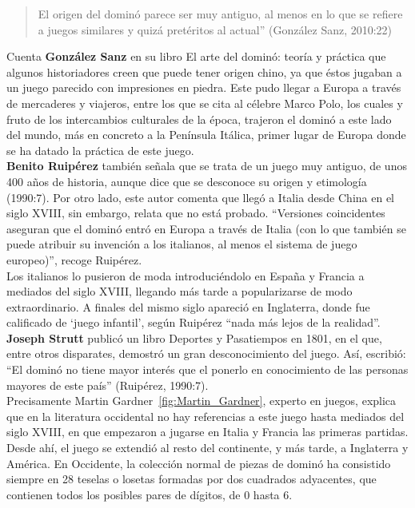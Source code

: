 \begin{quote}
El origen del dominó parece ser muy antiguo, al menos en lo que se refiere a juegos similares y quizá
pretéritos al actual” (González Sanz, 2010:22)
\end{quote}

Cuenta \textbf{González Sanz} en su libro El arte del dominó: teoría y práctica \cite{sanz00} que algunos historiadores
creen que puede tener origen chino, ya que éstos jugaban a un juego parecido con impresiones en piedra. Este pudo llegar a Europa a través de mercaderes y viajeros, entre los que se cita al célebre
Marco Polo, los cuales y fruto de los intercambios culturales de la época, trajeron el dominó a este
lado del mundo, más en concreto a la Península Itálica, primer lugar de Europa donde se ha datado la
práctica de este juego. \\

\textbf{Benito Ruipérez} \cite{mora90} también señala que se trata de un juego muy antiguo, de unos 400 años de historia,
aunque dice que se desconoce su origen y etimología (1990:7). Por otro lado, este autor comenta que
llegó a Italia desde China en el siglo XVIII, sin embargo, relata que no está probado. “Versiones
coincidentes aseguran que el dominó entró en Europa a través de Italia (con lo que también se puede
atribuir su invención a los italianos, al menos el sistema de juego europeo)”, recoge Ruipérez. \\

Los italianos lo pusieron de moda introduciéndolo en España y Francia a mediados del siglo XVIII,
llegando más tarde a popularizarse de modo extraordinario. A finales del mismo siglo apareció en
Inglaterra, donde fue calificado de ‘juego infantil’, según Ruipérez “nada más lejos de la realidad”.
\textbf{Joseph Strutt} publicó un libro Deportes y Pasatiempos en 1801, en el que, entre otros disparates,
demostró un gran desconocimiento del juego. Así, escribió: “El dominó no tiene mayor interés que
el ponerlo en conocimiento de las personas mayores de este país” (Ruipérez, 1990:7). \\

Precisamente Martin Gardner~\ref{fig:Martin_Gardner}, experto en juegos, explica que en la literatura occidental no hay
referencias a este juego hasta mediados del siglo XVIII, en que empezaron a jugarse en Italia y
Francia las primeras partidas. Desde ahí, el juego se extendió al resto del continente, y más tarde,
a Inglaterra y América. En Occidente, la colección normal de piezas de dominó ha consistido siempre
en 28 teselas o losetas formadas por dos cuadrados adyacentes, que contienen todos los posibles
pares de dígitos, de 0 hasta 6. \\

